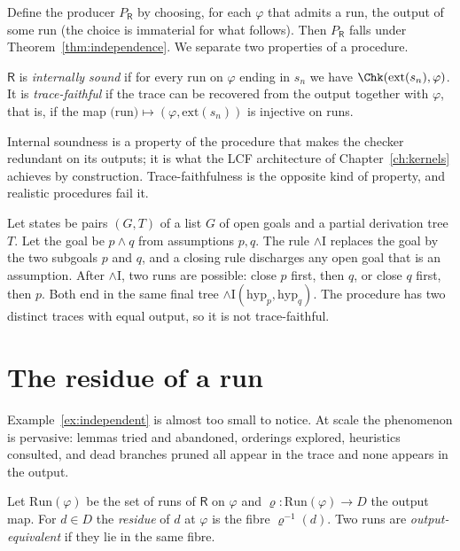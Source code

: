 Define the producer $P_{\mathsf{R}}$ by choosing, for each $\varphi$ that admits a run, the output of some run (the choice is immaterial for what follows). Then $P_{\mathsf{R}}$ falls under Theorem~\ref{thm:independence}. We separate two properties of a procedure.

\begin{definition}
\label{def:internal}
$\mathsf{R}$ is \emph{internally sound} if for every run on $\varphi$ ending in $s_n$ we have $\Chk(\mathrm{ext}(s_n),\varphi)$. It is \emph{trace-faithful} if the trace can be recovered from the output together with $\varphi$, that is, if the map $\text{(run)}\mapsto(\varphi,\mathrm{ext}(s_n))$ is injective on runs.
\end{definition}

Internal soundness is a property of the procedure that makes the checker redundant on its outputs; it is what the LCF architecture of Chapter~\ref{ch:kernels} achieves by construction. Trace-faithfulness is the opposite kind of property, and realistic procedures fail it.

\begin{example}
\label{ex:independent}
Let states be pairs $(G,T)$ of a list $G$ of open goals and a partial derivation tree $T$. Let the goal be $p\wedge q$ from assumptions $p,q$. The rule $\wedge\mathrm{I}$ replaces the goal by the two subgoals $p$ and $q$, and a closing rule discharges any open goal that is an assumption. After $\wedge\mathrm{I}$, two runs are possible: close $p$ first, then $q$, or close $q$ first, then $p$. Both end in the same final tree $\wedge\mathrm{I}(\mathrm{hyp}_p,\mathrm{hyp}_q)$. The procedure has two distinct traces with equal output, so it is not trace-faithful.
\end{example}

\section{The residue of a run}
\label{sec:residue}

Example~\ref{ex:independent} is almost too small to notice. At scale the phenomenon is pervasive: lemmas tried and abandoned, orderings explored, heuristics consulted, and dead branches pruned all appear in the trace and none appears in the output.

\begin{definition}[Residue]
\label{def:residue}
Let $\mathrm{Run}(\varphi)$ be the set of runs of $\mathsf{R}$ on $\varphi$ and $\varrho:\mathrm{Run}(\varphi)\to D$ the output map. For $d\in D$ the \emph{residue} of $d$ at $\varphi$ is the fibre $\varrho^{-1}(d)$. Two runs are \emph{output-equivalent} if they lie in the same fibre.
\end{definition}

